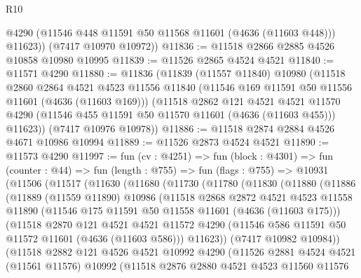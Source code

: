 \begin{lexlean}{R10}
\begin{coremodule}
          @4290
          (@11546 @448 @11591 @50 @11568 @11601 (@4636 (@11603 @448)))
          @11623))
      (@7417 @10970 @10972))
@11836 := @11518 @2866 @2885 @4526 @10858 @10980 @10995
@11839 := @11526 @2865 @4524 @4521
@11840 := @11571 @4290
@11880 := @11836
    (@11839
      (@11557 @11840)
      @10980
      (@11518
        @2860
        @2864
        @4521
        @4523
        @11556
        @11840
        (@11546 @169 @11591 @50 @11556 @11601 (@4636 (@11603 @169)))
        (@11518
          @2862
          @121
          @4521
          @4521
          @11570
          @4290
          (@11546 @455 @11591 @50 @11570 @11601 (@4636 (@11603 @455)))
          @11623))
      (@7417 @10976 @10978))
@11886 := @11518 @2874 @2884 @4526 @4671 @10986 @10994
@11889 := @11526 @2873 @4524 @4521
@11890 := @11573 @4290
@11997 := fun (cv : @4251) =>
  fun (block : @4301) =>
  fun (counter : @44) =>
  fun (length : @755) =>
  fun (flags : @755) =>
  @10931
    (@11506
      (@11517
        (@11630
          (@11680
            (@11730
              (@11780
                (@11830
                  (@11880
                    (@11886
                      (@11889
                        (@11559 @11890)
                        @10986
                        (@11518
                          @2868
                          @2872
                          @4521
                          @4523
                          @11558
                          @11890
                          (@11546 @175 @11591 @50 @11558 @11601 (@4636 (@11603 @175)))
                          (@11518
                            @2870
                            @121
                            @4521
                            @4521
                            @11572
                            @4290
                            (@11546 @586 @11591 @50 @11572 @11601 (@4636 (@11603 @586)))
                            @11623))
                        (@7417 @10982 @10984))
                      (@11518
                        @2882
                        @121
                        @4526
                        @4521
                        @10992
                        @4290
                        (@11526
                          @2881
                          @4524
                          @4521
                          (@11561 @11576)
                          @10992
                          (@11518
                            @2876
                            @2880
                            @4521
                            @4523
                            @11560
                            @11576

\end{coremodule}
\end{lexlean}
